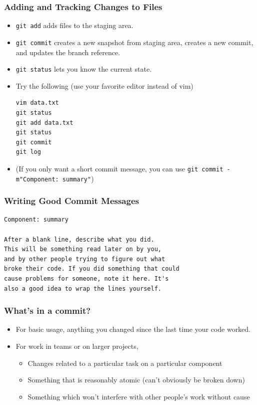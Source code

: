 \documentclass{beamer}
\begin{document}
\begin{frame}[fragile]
\frametitle{Adding and Tracking Changes to Files}
\begin{itemize}
\item \lstinline{git add} adds files to the staging area.
\item \lstinline{git commit} creates a new snapshot from staging area, creates a new commit, and updates the branch reference.
\item \lstinline{git status} lets you know the current state.
\item Try the following (use your favorite editor instead of vim)
\begin{lstlisting}
vim data.txt
git status
git add data.txt
git status
git commit
git log
\end{lstlisting}
\item (If you only want a short commit message, you can use \lstinline{git commit -m"Component: summary"})
\end{itemize}
\end{frame}

\begin{frame}[fragile]
\frametitle{Writing Good Commit Messages}
\begin{verbatim}
Component: summary

After a blank line, describe what you did. 
This will be something read later on by you,
and by other people trying to figure out what
broke their code. If you did something that could 
cause problems for someone, note it here. It's
also a good idea to wrap the lines yourself.
\end{verbatim}
\end{frame}

\begin{frame}[fragile]
\frametitle{What's in a commit?}
\begin{itemize}
\item For basic usage, anything you changed since the last time your code worked.
\item For work in teams or on larger projects,
\begin{itemize}
\item Changes related to a particular task on a particular component
\item Something that is reasonably atomic (can't obviously be broken down)
\item Something which won't interfere with other people's work without cause
\end{itemize}
\end{itemize}
\end{frame}
\end{document}
